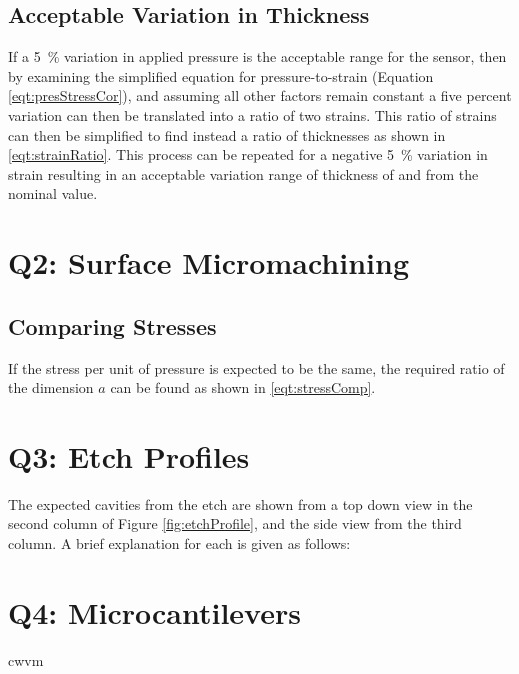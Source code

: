 \documentclass[hidelinks, 12pt]{article}%
\begin{document}
            \subsection{Acceptable Variation in Thickness}
                If a \SI{5}{\percent} variation in applied pressure is the acceptable range for the
                sensor, then by examining the simplified equation for pressure-to-strain (Equation 
                \ref{eqt:presStressCor}), and assuming all other factors remain constant a five percent
                variation can then be translated into a ratio of two strains.
                This ratio of strains can then be simplified to find instead a ratio of 
                thicknesses as shown in \ref{eqt:strainRatio}.
                This process can be repeated for a negative \SI{5}{\percent} variation in strain
                resulting in an acceptable variation range of thickness of  
                 and 
                 from the
                nominal value.

        \section{Q2: Surface Micromachining}
            \subsection{Comparing Stresses}
                If the stress per unit of pressure is expected to be the same, the required 
                ratio of the dimension $a$ can be found as shown in \ref{eqt:stressComp}.

        \section{Q3: Etch Profiles}
            The expected cavities from the etch are shown from a top down view in the second 
            column of Figure \ref{fig:etchProfile}, and the side view from the third column.
            A brief explanation for each is given as follows:

        \section{Q4: Microcantilevers}
            \gls{cwvm}
\end{document}

